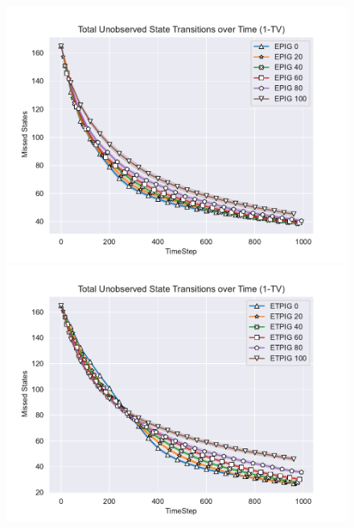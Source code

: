 \documentclass[12pt]{thesis}
\begin{document}
\begin{figure}[p]
	\includegraphics[scale=0.5]{"images/Epsilon_Missed_States_EPIG_1-TV.pdf"}
	\includegraphics[scale=0.5]{"images/Epsilon_Missed_States_ETPIG_1-TV.pdf"}
	

\end{figure}
\end{document}
